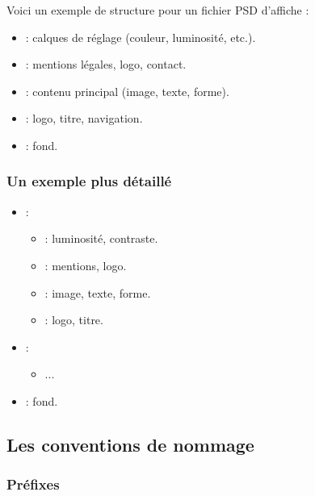 Voici un exemple de structure pour un fichier PSD d'affiche :

\begin{itemize}
    \item {} : calques de réglage (couleur, luminosité, etc.).
    \item {} : mentions légales, logo, contact.
    \item {} : contenu principal (image, texte, forme).
    \item {} : logo, titre, navigation.
    \item {} : fond.
\end{itemize}

\subsubsection{Un exemple plus détaillé}

\begin{itemize}
    \item {} :
    \begin{itemize}
        \item {} : luminosité, contraste.
        \item {} : mentions, logo.
        \item {} : image, texte, forme.
        \item {} : logo, titre.
    \end{itemize}
    \item {} :
    \begin{itemize}
        \item ...
    \end{itemize}
    \item {} : fond.
\end{itemize}

\subsection{Les conventions de nommage}

\subsubsection{Préfixes}

